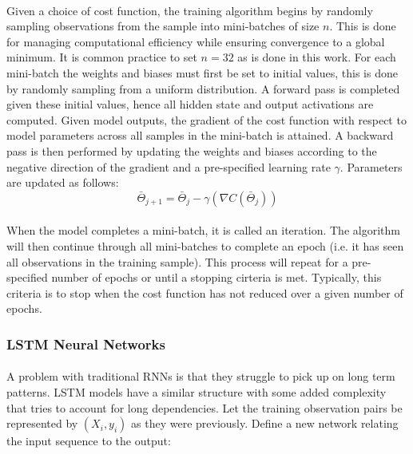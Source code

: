 \documentclass[11pt]{article}
\begin{document}
\begin{multicols*}{2}
                \vspace{-10pt}

                \paragraph{}
                    Given a choice of cost function, the training algorithm begins by randomly sampling observations from the sample into mini-batches of size $n$.
                    This is done for managing computational efficiency while ensuring convergence to a global minimum.  
                    It is common practice to set $n = 32$ as is done in this work.
                    For each mini-batch the weights and biases must first be set to initial values, this is done by randomly sampling from a uniform distribution.
                    A forward pass is completed given these initial values, hence all hidden state and output activations are computed.
                    Given model outputs, the gradient of the cost function with respect to model parameters across all samples in the mini-batch is attained. 
                    A backward pass is then performed by updating the weights and biases according to the negative direction of the gradient and a pre-specified learning rate $\gamma$. 
                    Parameters are updated as follows: $$\bar{\Theta}_{j+1} = \bar{\Theta}_j - \gamma (\nabla C(\bar{\Theta}_j))$$

                \paragraph{}
                    When the model completes a mini-batch, it is called an iteration. 
                    The algorithm will then continue through all mini-batches to complete an epoch (i.e. it has seen all observations in the training sample).
                    This process will repeat for a pre-specified number of epochs or until a stopping cirteria is met.
                    Typically, this criteria is to stop when the cost function has not reduced over a given number of epochs. 
                    

            \vspace{-5pt}

            \subsubsection*{LSTM Neural Networks}
                \paragraph{}
                    A problem with traditional RNNs is that they struggle to pick up on long term patterns.
                    LSTM models have a similar structure with some added complexity that tries to account for long dependencies. 
                    Let the training observation pairs be represented by $(X_i,y_i)$ as they were previously.
                    Define a new network relating the input sequence to the output:


\end{multicols*}
\end{document}
